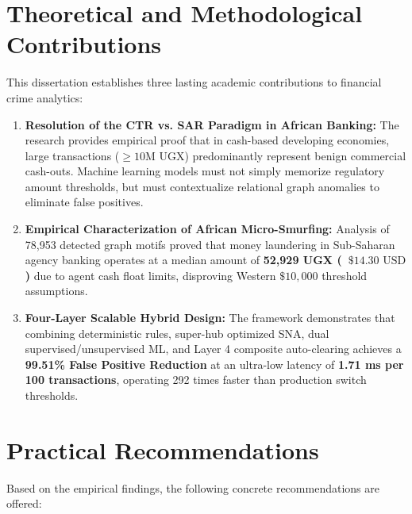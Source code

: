 \section{Theoretical and Methodological Contributions}
This dissertation establishes three lasting academic contributions to financial crime analytics:
\begin{enumerate}
    \item \textbf{Resolution of the CTR vs. SAR Paradigm in African Banking:} The research provides empirical proof that in cash-based developing economies, large transactions ($\ge 10\text{M UGX}$) predominantly represent benign commercial cash-outs. Machine learning models must not simply memorize regulatory amount thresholds, but must contextualize relational graph anomalies to eliminate false positives.
    \item \textbf{Empirical Characterization of African Micro-Smurfing:} Analysis of 78,953 detected graph motifs proved that money laundering in Sub-Saharan agency banking operates at a median amount of \textbf{52,929 UGX (~$\$14.30\text{ USD}$)} due to agent cash float limits, disproving Western $\$10,000$ threshold assumptions.
    \item \textbf{Four-Layer Scalable Hybrid Design:} The framework demonstrates that combining deterministic rules, super-hub optimized SNA, dual supervised/unsupervised ML, and Layer 4 composite auto-clearing achieves a \textbf{99.51\% False Positive Reduction} at an ultra-low latency of \textbf{1.71 ms per 100 transactions}, operating 292 times faster than production switch thresholds.
\end{enumerate}

\section{Practical Recommendations}
Based on the empirical findings, the following concrete recommendations are offered:

